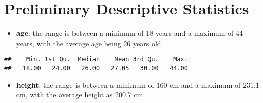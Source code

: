 \documentclass[
]{book}
\newenvironment{Shaded}{\begin{snugshade}}{\end{snugshade}}
\newcommand{\CommentTok}[1]{\textcolor[rgb]{0.56,0.35,0.01}{\textit{#1}}}
\newcommand{\DecValTok}[1]{\textcolor[rgb]{0.00,0.00,0.81}{#1}}
\newcommand{\FunctionTok}[1]{\textcolor[rgb]{0.13,0.29,0.53}{\textbf{#1}}}
\newcommand{\NormalTok}[1]{#1}
\newcommand{\OtherTok}[1]{\textcolor[rgb]{0.56,0.35,0.01}{#1}}
\newcommand{\SpecialCharTok}[1]{\textcolor[rgb]{0.81,0.36,0.00}{\textbf{#1}}}
\providecommand{\tightlist}{%
  \setlength{\itemsep}{0pt}\setlength{\parskip}{0pt}}
\begin{document}
\begin{Shaded}
\end{Shaded}

\hypertarget{preliminary-descriptive-statistics}{%
\section{Preliminary Descriptive Statistics}\label{preliminary-descriptive-statistics}}

\begin{itemize}
\tightlist
\item
  \textbf{age}: the range is between a minimum of 18 years and a maximum of 44 years, with the average age being 26 years old.
\end{itemize}

\begin{Shaded}
\end{Shaded}

\begin{verbatim}
##    Min. 1st Qu.  Median    Mean 3rd Qu.    Max. 
##   18.00   24.00   26.00   27.05   30.00   44.00
\end{verbatim}

\begin{itemize}
\tightlist
\item
  \textbf{height}: the range is between a minimum of 160 cm and a maximum of 231.1 cm, with the average height as 200.7 cm.
\end{itemize}

\begin{Shaded}
\end{Shaded}
\end{document}
